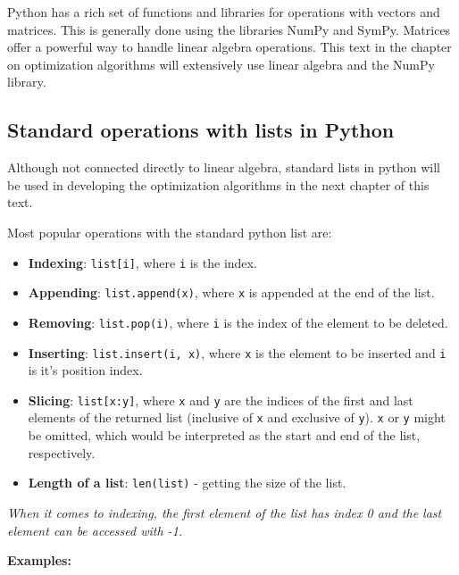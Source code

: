 \documentclass[11pt]{article}
\providecommand{\tightlist}{%
      \setlength{\itemsep}{0pt}\setlength{\parskip}{0pt}}
\begin{document}
Python has a rich set of functions and libraries for operations with
vectors and matrices. This is generally done using the libraries NumPy
and SymPy. Matrices offer a powerful way to handle linear algebra
operations. This text in the chapter on optimization algorithms will
extensively use linear algebra and the NumPy library.

    \subsection{Standard operations with lists in
Python}\label{standard-operations-with-lists-in-python}

Although not connected directly to linear algebra, standard lists in
python will be used in developing the optimization algorithms in the
next chapter of this text.

Most popular operations with the standard python list are:

\begin{itemize}
\tightlist
\item
  \textbf{Indexing}: \texttt{list{[}i{]}}, where \texttt{i} is the
  index.
\item
  \textbf{Appending}: \texttt{list.append(x)}, where \texttt{x} is
  appended at the end of the list.
\item
  \textbf{Removing}: \texttt{list.pop(i)}, where \texttt{i} is the index
  of the element to be deleted.
\item
  \textbf{Inserting}: \texttt{list.insert(i,\ x)}, where \texttt{x} is
  the element to be inserted and \texttt{i} is it's position index.
\item
  \textbf{Slicing}: \texttt{list{[}x:y{]}}, where \texttt{x} and
  \texttt{y} are the indices of the first and last elements of the
  returned list (inclusive of \texttt{x} and exclusive of \texttt{y}).
  \texttt{x} or \texttt{y} might be omitted, which would be interpreted
  as the start and end of the list, respectively.
\item
  \textbf{Length of a list}: \texttt{len(list)} - getting the size of
  the list.
\end{itemize}

\emph{When it comes to indexing, the first element of the list has index
0 and the last element can be accessed with -1.}

\textbf{Examples:}
\end{document}
